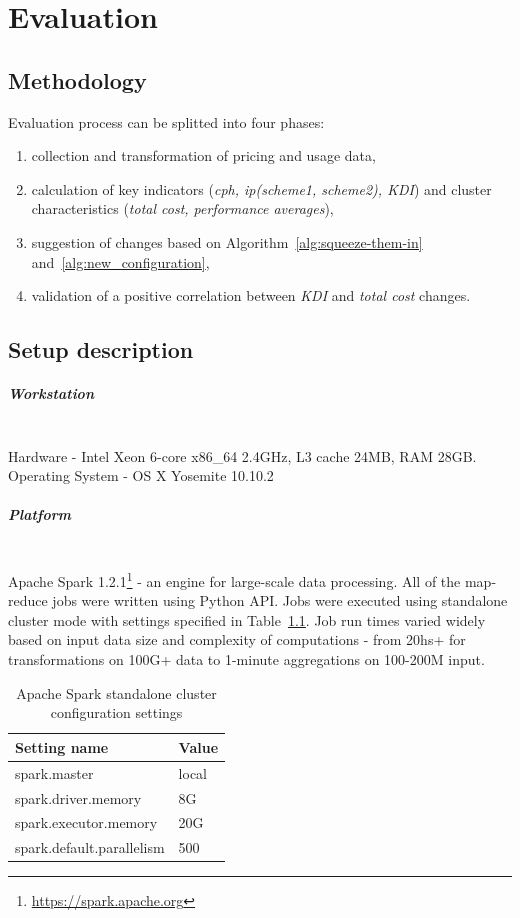 \documentclass[]{final_report}
\newcommand{\myparagraph}[1]{\paragraph{#1}\mbox{}\\}
\begin{document}

\chapter{Evaluation}

\section{Methodology}

Evaluation process can be splitted into four phases:
\begin{enumerate}
\item collection and transformation of pricing and usage data,
\item calculation of key indicators (\textit{cph, ip(scheme1, scheme2), KDI}) and cluster characteristics (\textit{total cost, performance averages}), 
\item suggestion of changes based on Algorithm~\ref{alg:squeeze-them-in} and~\ref{alg:new_configuration},
\item validation of a positive correlation between \textit{KDI} and \textit{total cost} changes.
\end{enumerate}

\section{Setup description}

\myparagraph{Workstation}
Hardware - Intel Xeon 6-core x86\_64 2.4GHz, L3 cache 24MB, RAM 28GB. \\
Operating System - OS X Yosemite 10.10.2

\myparagraph{Platform}
Apache Spark 1.2.1\footnote{\url{https://spark.apache.org}} - an engine for large-scale data processing. All of the map-reduce jobs were written using Python API. Jobs were executed using standalone cluster mode with settings specified in Table~\ref{tab:spark_conf}. Job run times varied widely based on input data size and complexity of computations - from 20hs+ for transformations on 100G+ data to 1-minute aggregations on 100-200M input.

\begin{table}[h]
\begin{center}
    \begin{tabular}{| l | l |}
    \hline
    \textbf{Setting name} & \textbf{Value} \\
    \hline
    spark.master & local \\
    \hline
    spark.driver.memory & 8G \\
    \hline
    spark.executor.memory & 20G \\
    \hline
    spark.default.parallelism & 500 \\
    \hline
    \end{tabular}
\end{center}
\caption{Apache Spark standalone cluster configuration settings} 
\label{tab:spark_conf}
\end{table}
\end{document}
